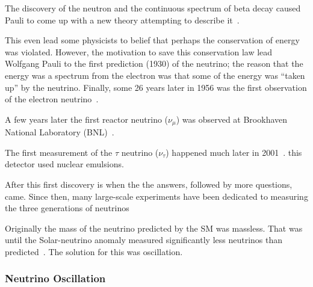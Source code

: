 The discovery of the neutron and the continuous spectrum of beta decay caused Pauli to come up with a new theory attempting to describe it~\citep{pauli_1934}.

This even lead some physicists to belief that perhaps the conservation of energy was violated.
However, the motivation to save this conservation law lead Wolfgang Pauli to the first prediction (1930) of the neutrino; the reason that the energy was a spectrum from the electron was that some of the energy was ``taken up'' by the neutrino.
Finally, some 26 years later in 1956 was the first observation of the electron neutrino~\citep{first_neutrino_measurement}.

A few years later the first reactor neutrino ($\nu_{\mu}$) was observed at Brookhaven National Laboratory (BNL)~\citep{PhysRevLett.9.36}.

The first measurement of the $\tau$ neutrino ($\nu_{\tau}$) happened much later in 2001~\citep{tau_neutrino_discovery_KODAMA2001218}.
this detector used nuclear emulsions.



After this first discovery is when the the answers, followed by more questions, came.
Since then, many large-scale experiments have been dedicated to measuring the three generations of neutrinos
~\citep{SNO_2002_neutrino_PhysRevLett.89.011301,
neutrino_measurement_NOvA_2019_prl,
t2k_2011_neutrino_PhysRevLett.107.041801,
reno_2012_neutrino_PhysRevLett.108.191802,
FUKUDA2002_solar_neutrino_oscillation,
kamland_2003_neutrino_PhysRevLett.90.021802,
daya_bay_2012_neutrino_PhysRevLett.108.171803,
doubleChooz_2012_neutrino_PhysRevLett.108.131801}

Originally the mass of the neutrino predicted by the SM was massless.
That was until the Solar-neutrino anomaly measured significantly less neutrinos than predicted~\citep{solar_neutrino_problem_PhysRevLett.20.1205}.
The solution for this was oscillation.


\subsubsection{Neutrino Oscillation}

